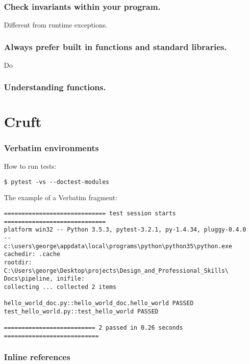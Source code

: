 \documentclass{beamer} %
\begin{document}
\begin{frame}
\frametitle{Check invariants within your program.}

Different from runtime exceptions.
\end{frame}



\begin{frame}
\frametitle{Always prefer built in functions and standard libraries.}

Do 

\end{frame}

\begin{frame}
\frametitle{Understanding functions.}
\end{frame}




\section{Cruft}

\begin{frame}[fragile]
\frametitle{Verbatim environments} 

How to run tests:
\begin{verbatim}
$ pytest -vs --doctest-modules
\end{verbatim}

\vspace{5mm}  

The example of a Verbatim fragment:
\scriptsize %
\begin{verbatim}
============================= test session starts =============================
platform win32 -- Python 3.5.3, pytest-3.2.1, py-1.4.34, pluggy-0.4.0 -- 
c:\users\george\appdata\local\programs\python\python35\python.exe
cachedir: .cache
rootdir: C:\Users\george\Desktop\projects\Design_and_Professional_Skills\
Docs\pipeline, inifile:
collecting ... collected 2 items

hello_world_doc.py::hello_world_doc.hello_world PASSED
test_hello_world.py::test_hello_world PASSED

========================== 2 passed in 0.26 seconds ===========================
\end{verbatim}

\end{frame}

\begin{frame}
\frametitle{Inline references}


\end{frame}


\end{document}
